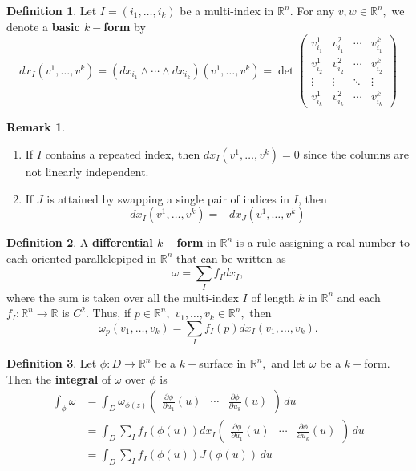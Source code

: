 \documentclass[10pt, oneside]{article}
\newcommand{\bbR}{\mathbb{R}}
\theoremstyle{definition}
\newtheorem{defn}{Definition}
\newtheorem{rem}{Remark}
\begin{document}
\begin{defn}
Let $I = (i_1, \dots, i_k)$ be a multi-index in $\bbR^n.$ 
    For any $v,w \in \bbR^n,$ we denote a \textbf{basic $k-$form} by 
    \[dx_I(v^1, \dots, v^k) = (dx_{i_1}\wedge \cdots \wedge dx_{i_k})(v^1, \dots, v^k) = \det \begin{pmatrix}
        v^1_{i_1} & v^2_{i_1} & \cdots & v^k_{i_1}\\
        v^1_{i_2} & v^2_{i_2} & \cdots & v^k_{i_2}\\
        \vdots &\vdots & \ddots &\vdots\\
        v^1_{i_k} & v^2_{i_k} & \cdots & v^k_{i_k}
    \end{pmatrix}\]
\end{defn}
\begin{rem}
    \begin{enumerate}
        \item If $I$ contains a repeated index, then $dx_I(v^1, \dots, v^k) = 0$ since the columns are not linearly independent.
        \item If $J$ is attained by swapping a single pair of indices in $I$, then 
        \[dx_I(v^1, \dots, v^k) = -dx_J (v^1, \dots, v^k)\]
    \end{enumerate}
\end{rem}

\begin{defn}
    A \textbf{differential $k-$form} in $\bbR^n$ is a rule assigning a real number to each oriented parallelepiped in $\bbR^n$ that can be written as 
    \[\omega = \sum_{I}f_I dx_I,\] where the sum is taken over all the multi-index $I$ of length $k$ in $\bbR^n$ and each $f_I: \bbR^n \to \bbR$ is $C^2.$  Thus, if $p \in \bbR^n,$ $v_1, \dots, v_k \in \bbR^n,$ then 
\[\omega_p(v_1, \dots, v_k) = \sum_{I} f_I(p)dx_I(v_1, \dots, v_k).\]
\end{defn}


\begin{defn}
    Let $\phi: D\to \bbR^n$ be a $k-$surface in $\bbR^n,$ and let $\omega$ be a $k-$form. Then the \textbf{integral} of $\omega$ over $\phi$ is 
    \begin{align*}
        \int_\phi \omega &= \int_D \omega_{\phi(z)} \begin{pmatrix}
            \frac{\partial \phi}{\partial u_1}( u)& \cdots& \frac{\partial \phi}{\partial u_k}( u)
        \end{pmatrix} \, du\\
        &= \int_D \sum_{I}f_I(\phi(u))dx_I\begin{pmatrix}
            \frac{\partial \phi}{\partial u_1}( u)& \cdots& \frac{\partial \phi}{\partial u_k}( u)
        \end{pmatrix} \, du\\
        &= \int_D \sum_{I} f_I(\phi(u)) J(\phi(u)) \, du
    \end{align*}
\end{defn}
\end{document}
